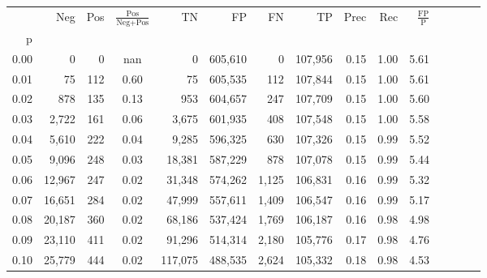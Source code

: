 \begin{tabular}{rrrcrrrrrrrrrrr}
\toprule
{} &     Neg &    Pos & $\frac{\text{Pos}}{\text{Neg}+\text{Pos}}$ &       TN &       FP &       FN &       TP &  Prec &   Rec & $\frac{\text{FP}}{\text{P}}$ \\
p    &         &        &                                            &          &          &          &          &       &       &                              \\
\midrule
0.00 &       0 &      0 &                                        nan &        0 &  605,610 &        0 &  107,956 &  0.15 &  1.00 &                         5.61 \\
0.01 &      75 &    112 &                                       0.60 &       75 &  605,535 &      112 &  107,844 &  0.15 &  1.00 &                         5.61 \\
0.02 &     878 &    135 &                                       0.13 &      953 &  604,657 &      247 &  107,709 &  0.15 &  1.00 &                         5.60 \\
0.03 &   2,722 &    161 &                                       0.06 &    3,675 &  601,935 &      408 &  107,548 &  0.15 &  1.00 &                         5.58 \\
0.04 &   5,610 &    222 &                                       0.04 &    9,285 &  596,325 &      630 &  107,326 &  0.15 &  0.99 &                         5.52 \\
0.05 &   9,096 &    248 &                                       0.03 &   18,381 &  587,229 &      878 &  107,078 &  0.15 &  0.99 &                         5.44 \\
0.06 &  12,967 &    247 &                                       0.02 &   31,348 &  574,262 &    1,125 &  106,831 &  0.16 &  0.99 &                         5.32 \\
0.07 &  16,651 &    284 &                                       0.02 &   47,999 &  557,611 &    1,409 &  106,547 &  0.16 &  0.99 &                         5.17 \\
0.08 &  20,187 &    360 &                                       0.02 &   68,186 &  537,424 &    1,769 &  106,187 &  0.16 &  0.98 &                         4.98 \\
0.09 &  23,110 &    411 &                                       0.02 &   91,296 &  514,314 &    2,180 &  105,776 &  0.17 &  0.98 &                         4.76 \\
0.10 &  25,779 &    444 &                                       0.02 &  117,075 &  488,535 &    2,624 &  105,332 &  0.18 &  0.98 &                         4.53 \\

\end{tabular}
